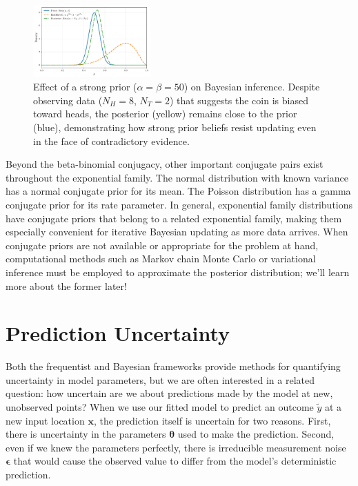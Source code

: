 \begin{exampleBox}
    \begin{figure}[H]
        \centering
        \includegraphics[width=0.4\textwidth]{figs/models-vs-data/beta_binomial_strong_prior.pdf}
        \caption{Effect of a strong prior ($\alpha = \beta = 50$) on Bayesian inference. Despite observing data ($N_H = 8$, $N_T = 2$) that suggests the coin is biased toward heads, the posterior (yellow) remains close to the prior (blue), demonstrating how strong prior beliefs resist updating even in the face of contradictory evidence.}
        \label{fig:beta-binomial-strong-prior}
    \end{figure}
\end{exampleBox}

Beyond the beta-binomial conjugacy, other important conjugate pairs exist throughout the exponential family. The normal distribution with known variance has a normal conjugate prior for its mean. The Poisson distribution has a gamma conjugate prior for its rate parameter. In general, exponential family distributions have conjugate priors that belong to a related exponential family, making them especially convenient for iterative Bayesian updating as more data arrives. When conjugate priors are not available or appropriate for the problem at hand, computational methods such as Markov chain Monte Carlo or variational inference must be employed to approximate the posterior distribution; we'll learn more about the former later!

\section{Prediction Uncertainty}

Both the frequentist and Bayesian frameworks provide methods for quantifying uncertainty in model parameters, but we are often interested in a related question: how uncertain are we about predictions made by the model at new, unobserved points? When we use our fitted model to predict an outcome $\tilde{y}$ at a new input location $\mathbf{x}$, the prediction itself is uncertain for two reasons. First, there is uncertainty in the parameters $\boldsymbol{\theta}$ used to make the prediction. Second, even if we knew the parameters perfectly, there is irreducible measurement noise $\boldsymbol{\epsilon}$ that would cause the observed value to differ from the model's deterministic prediction.

